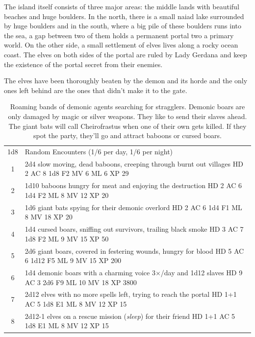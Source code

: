 \documentclass[11pt]{bxart}
\begin{document}
The island itself consists of three major areas: the middle lands with
beautiful beaches and huge boulders. In the north, there is a small
naiad lake surrounded by huge boulders and in the south, where a big
pile of these boulders runs into the sea, a gap between two of them
holds a permanent portal two a primary world. On the other side, a
small settlement of elves lives along a rocky ocean coast. The elves
on both sides of the portal are ruled by Lady Gerdana
and keep the existence of the portal secret from their enemies.

The elves have been thoroughly beaten by the demon and its horde and
the only ones left behind are the ones that didn't make it to the
gate.

\begin{table}[b]
  \small
  \centering
  \begin{tabular}{cl}
    1d8 & Random Encounters (1/6 per day, 1/6 per night) \\
    \cmidrule(lr){1-1}\cmidrule(lr){2-2}
    1 & 2d4 slow moving, dead baboons, creeping through burnt out villages HD 2 AC 8 1d8 F2 MV 6 ML 6 XP 29 \\
    2 & 1d10 baboons hungry for meat and enjoying the destruction HD 2 AC 6 1d4 F2 ML 8 MV 12 XP 20 \\
    3 & 1d6 giant bats spying for their demonic overlord HD 2 AC 6 1d4 F1 ML 8 MV 18 XP 20 \\
    4 & 1d4 cursed boars, sniffing out survivors, trailing black smoke HD 3 AC 7 1d8 F2 ML 9 MV 15 XP 50 \\
    5 & 2d6 giant boars, covered in festering wounds, hungry for blood HD 5 AC 6 1d12 F5 ML 9 MV 15 XP 200 \\
    6 & 1d4 demonic boars with a charming voice 3×/day and 1d12 slaves HD 9 AC 3 2d6 F9 ML 10 MV 18 XP 3800 \\
    7 & 2d12 elves with no more spells left, trying to reach the portal HD 1+1 AC 5 1d8 E1 ML 8 MV 12 XP 15 \\
    8 & 2d12-1 elves on a rescue mission (\emph{sleep}) for their friend HD 1+1 AC 5 1d8 E1 ML 8 MV 12 XP 15 \\
  \end{tabular}
  \caption{Roaming bands of demonic agents searching for stragglers.
    Demonic boars are only damaged by magic or silver weapons. They
    like to send their slaves ahead. The giant bats will call
    Cheirofrastus when one of their own gets killed. If they spot the
    party, they'll go and attract baboons or cursed boars.}
\end{table}
\end{document}
